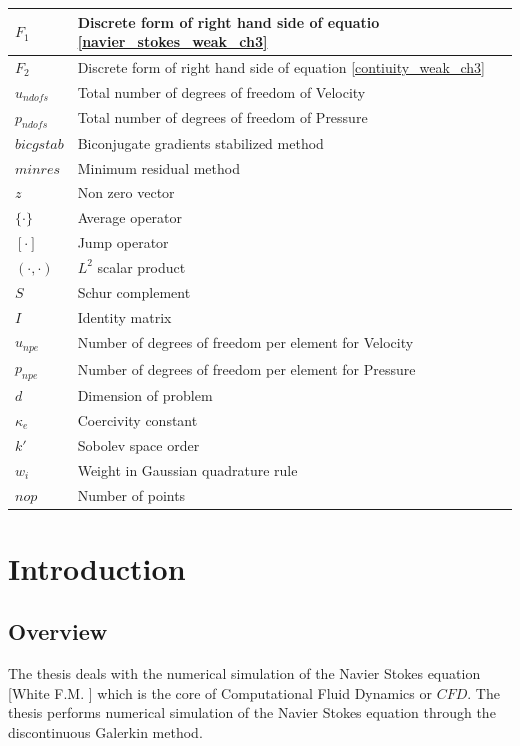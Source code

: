 \documentclass[a4paper,openany]{book}
\begin{document}
\begin{longtable}{| p{} | p{} |}
\hline
$F_1$ & Discrete form of right hand side of equatio \eqref{navier_stokes_weak_ch3}\\
\hline
$F_2$ & Discrete form of right hand side of equation \eqref{contiuity_weak_ch3}\\
\hline
$u_{ndofs}$ & Total number of degrees of freedom of Velocity\\
\hline
$p_{ndofs}$ & Total number of degrees of freedom of Pressure\\
\hline
$bicgstab$ & Biconjugate gradients stabilized method\\
\hline
$minres$ & Minimum residual method\\
\hline
$z$ & Non zero vector\\
\hline
$\lbrace \cdot \rbrace$ & Average operator\\
\hline
$[\cdot]$ & Jump operator\\
\hline
$(\cdot,\cdot)$ & $L^2$ scalar product\\
\hline
$S$ & Schur complement\\
\hline
$I$ & Identity matrix\\
\hline
$u_{npe}$ & Number of degrees of freedom per element for Velocity\\
\hline
$p_{npe}$ & Number of degrees of freedom per element for Pressure\\
\hline
$d$ & Dimension of problem\\
\hline
$\kappa_e$ & Coercivity constant\\
\hline
$k'$ & Sobolev space order\\
\hline
$w_i$ & Weight in Gaussian quadrature rule\\
\hline
$nop$ & Number of points\\
\hline
\end{longtable}
\listoffigures
\listoftables

\tableofcontents

\chapter{Introduction}

\section{Overview}

The thesis deals with the numerical simulation of the Navier Stokes equation [White F.M. \cite{white}] which is the core of Computational Fluid Dynamics or $CFD$. The thesis performs numerical simulation of the Navier Stokes equation through the discontinuous Galerkin method.
\end{document}

